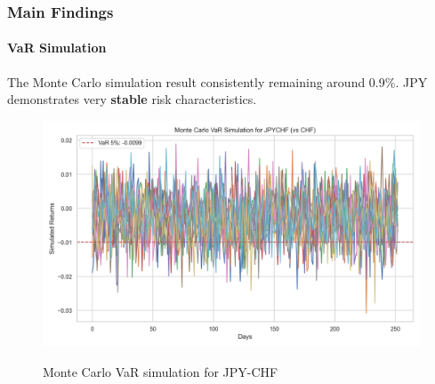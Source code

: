 \documentclass[10pt]{beamer}
\begin{document}
\begin{frame}
\frametitle{Main Findings}
\framesubtitle{VaR Simulation}
The Monte Carlo simulation result consistently remaining around 0.9\%. JPY demonstrates very \textbf{stable} risk characteristics. 
\begin{figure}
    \centering   \includegraphics[width=0.9\linewidth]{../../reports/figures/monte_carlo_var_simulation_JPYCHF_vs_CHF.png}  \label{fig:monte_carlo_var_simulation_JPYCHF_vs_CHF}
    \caption{Monte Carlo VaR simulation for JPY-CHF}
\end{figure}
\end{frame}
\end{document}
